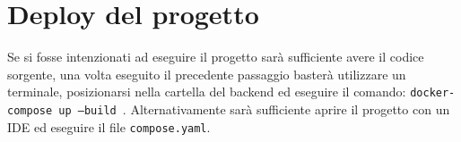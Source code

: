 \section{Deploy del progetto}
    Se si fosse intenzionati ad eseguire il progetto sarà sufficiente avere 
    il codice sorgente, una volta eseguito il precedente passaggio basterà 
    utilizzare un terminale, posizionarsi nella cartella del backend ed eseguire 
    il comando: \texttt{docker-compose up --build }. Alternativamente sarà 
    sufficiente aprire il progetto con un IDE ed eseguire il file \texttt{compose.yaml}.